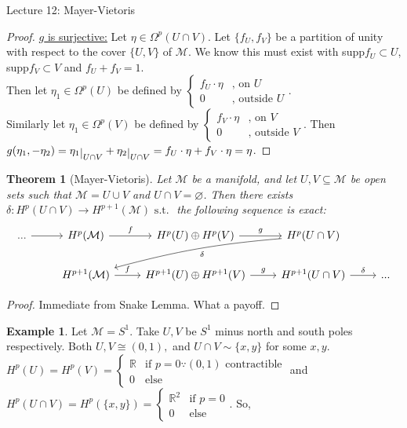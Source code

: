 \documentclass[10pt]{article}
\theoremstyle{plain}
\newtheorem{theorem}{Theorem}[section]
\theoremstyle{definition}
\newtheorem{exmp}[thm]{Example} %
\newcommand{\st}{\text{ s.t. }}
\newcommand{\Real}{\mathbb{R}}
\newcommand{\man}{\mathcal{M}}
\def\restrict#1{\raise-.5ex\hbox{\ensuremath|}_{#1}}
\newcommand{\UintV}{U\cap V}
\begin{document}
\begin{section}{Lecture 12: Mayer-Vietoris}
\begin{proof}
\underline{$g$ is surjective:} Let $\eta \in \Omega^p(\UintV).$ Let $\{f_U,f_V\}$ be a partition of unity with respect to the cover $\{U,V\}$ of $\man$. We know this must exist with supp$f_U \subset U$, supp$f_V\subset V$ and $f_U + f_V = 1$.\\
Then let $\eta_1\in \Omega^p(U)$ be defined by  $\begin{cases} f_U\cdot \eta &\text{, on } U \\ 0  &\text{, outside } U \end{cases}$.\\
Similarly let $\eta_1\in \Omega^p(V)$ be defined by  $\begin{cases} f_V\cdot \eta &\text{, on } V \\ 0  &\text{, outside } V \end{cases}$. Then $g(\eta_1 ,- \eta_2) = \eta_1 \restrict{\UintV} + \eta_2\restrict{\UintV} = f_U \cdot\eta + f_V \cdot \eta = \eta$.
\end{proof}
\begin{theorem}[Mayer-Vietoris]\label{thm:mayervietoris}
Let $\man$ be a manifold, and let $U,V\subseteq \man$ be open sets such that $\man = U \cup V$ and $\UintV = \varnothing$. Then there exists $\delta : H^p(\UintV) \to H^{p+1}(\man) \st$ the following sequence is exact:
$$\begin{tikzcd}
... \arrow[r] & H^p(\mathcal{M}) \arrow[r, "f"]     & H^p(U)\oplus H^p(V) \arrow[r, "g"]         & H^p(\UintV) \arrow[lld, "\delta",bend right = 5] &     \\
              & H^{p+1}(\mathcal{M}) \arrow[r, "f"] & H^{p+1}(U)\oplus H^{p+1}(V) \arrow[r, "g"] & H^{p+1}(\UintV) \arrow[r, "\delta"]                          & ...
\end{tikzcd}$$
\end{theorem}
\begin{proof}
Immediate from Snake Lemma. What a payoff.
\end{proof}
\begin{exmp} Let $\man = S^1.$ Take $U,V$ be $S^1$ minus north and south poles respectively. Both $U, V \cong (0,1),$ and $\UintV \sim \{x,y\} $ for some $x,y$. $H^p(U) = H^p(V) = \begin{cases} \Real &\text{if } p = 0 \because (0,1) \text{ contractible} \\ 0 &\text{else} \end{cases}$ and $H^p(\UintV) = H^p(\{x,y\}) = \begin{cases} \Real^2&\text{if } p = 0 \\ 0 &\text{else} \end{cases}$. So, $$ 
$$
\end{exmp}
\end{section}
\end{document}
